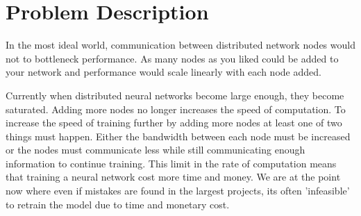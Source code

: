 \clearpage
\section{Problem Description}

In the most ideal world, communication between distributed network nodes would
not to bottleneck performance. As many nodes as you liked could be added to your
network and performance would scale linearly with each node added.



Currently when distributed neural networks become large enough, they become
saturated. Adding more nodes no longer increases the speed of computation. To
increase the speed of training further by adding more nodes at least one of two
things must happen. Either the bandwidth between each node must be increased or
the nodes must communicate less while still communicating enough information to
continue training.\cite{li2014communication}\cite{SunTimeDataflow} This limit in
the rate of computation means that training a neural network cost more time and
money. We are at the point now where even if mistakes are found in the largest
projects, its often 'infeasible' to retrain the model due to time and monetary
cost. \cite{fewshowlearners2020gpt}

